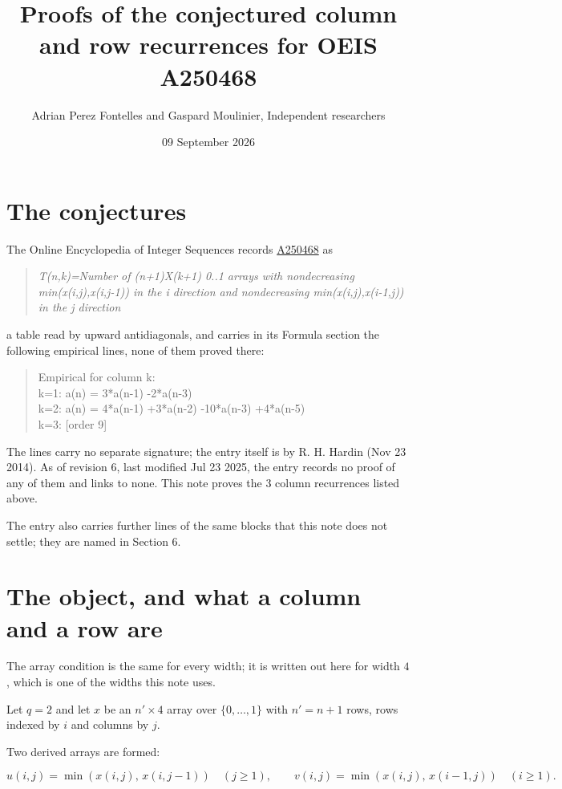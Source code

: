 \documentclass[11pt]{article}
\title{Proofs of the conjectured column and row recurrences for OEIS A250468}
\author{Adrian Perez Fontelles and Gaspard Moulinier, Independent researchers}
\date{09 September 2026}
\theoremstyle{definition}
\begin{document}
\maketitle
\section{The conjectures}

The Online Encyclopedia of Integer Sequences records \href{https://oeis.org/A250468}{A250468} as

\begin{quote}\itshape T(n,k)=Number of (n+1)X(k+1) 0..1 arrays with nondecreasing min(x(i,j),x(i,j-1)) in the i direction and nondecreasing min(x(i,j),x(i-1,j)) in the j direction\end{quote}

a table read by upward antidiagonals, and carries in its Formula section the following empirical lines, none of them proved there:

\begin{quote}\ttfamily Empirical for column k:\\
k=1: a(n) = 3*a(n-1) -2*a(n-3)\\k=2: a(n) = 4*a(n-1) +3*a(n-2) -10*a(n-3) +4*a(n-5)\\k=3: [order 9]\end{quote}

The lines carry no separate signature; the entry itself is by R. H. Hardin (Nov 23 2014). As of revision 6, last modified Jul 23 2025, the entry records no proof of any of them and links to none. This note proves the 3 column recurrences listed above.

The entry also carries further lines of the same blocks that this note does not settle; they are named in Section 6.

\section{The object, and what a column and a row are}

The array condition is the same for every width; it is written out here for width $4$, which is one of the widths this note uses.

Let $q = 2$ and let $x$ be an $n' \times 4$ array over $\{0,\dots,1\}$ with $n' = n + 1$ rows, rows indexed by $i$ and columns by $j$.

Two derived arrays are formed:

\[u(i,j) = \min(x(i,j),\,x(i,j{-}1))\quad (j \ge 1), \qquad v(i,j) = \min(x(i,j),\,x(i{-}1,j))\quad (i \ge 1).\]
\end{document}
